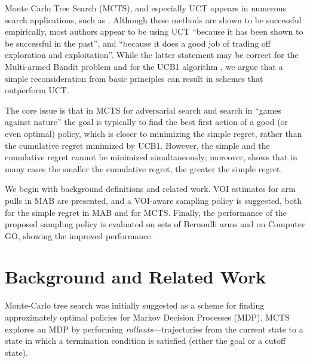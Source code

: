
Monte Carlo Tree Search (MCTS), and especially UCT \cite{Kocsis.uct}
appears in numerous search applications, such
as \cite{Eyerich.ctp}. Although these methods are shown to be
successful empirically, most authors appear to be using UCT ``because
it has been shown to be successful in the past'', and ``because it
does a good job of trading off exploration and exploitation''. While
the latter statement may be correct for the Multi-armed Bandit problem
and for the UCB1 algorithm \cite{Auer.ucb}, we argue that a simple
reconsideration from basic principles can result in schemes that
outperform UCT.

The core issue is that in MCTS for adversarial search and search in
``games against nature'' the goal is typically to find the best
first action of a good (or even optimal) policy, which is closer to
minimizing the simple regret, rather than the cumulative regret
minimized by UCB1.  However, the simple and the cumulative regret
cannot be minimized simultaneously; moreover, \cite{Bubeck.pure} shows
that in many cases the smaller the cumulative regret, the greater the
simple regret.

We begin with background definitions and related work.  VOI estimates
for arm pulls in MAB are presented, and a VOI-aware sampling policy is
suggested, both for the simple regret in MAB and for MCTS.  Finally,
the performance of the proposed sampling policy is evaluated on sets
of Bernoulli arms and on Computer GO, showing the improved
performance.

\section{Background and Related Work}
\label{sec:mcts-related-work}

Monte-Carlo tree search was initially suggested as a scheme for
finding approximately optimal policies for Markov Decision Processes
(MDP).  MCTS explores an MDP by performing
\emph{rollouts}---trajectories from the current state to a state in
which a termination condition is satisfied (either the goal or a
cutoff state).

